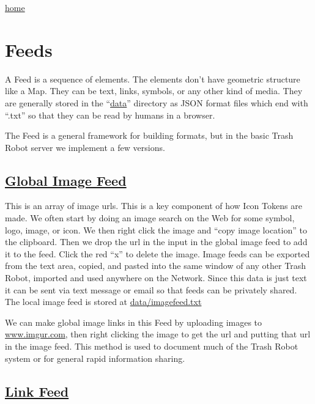 \href{index.html}{home}

\hypertarget{feeds}{%
\section{Feeds}\label{feeds}}

A Feed is a sequence of elements. The elements don't have geometric
structure like a Map. They can be text, links, symbols, or any other
kind of media. They are generally stored in the ``\href{data/}{data}''
directory as JSON format files which end with ``.txt'' so that they can
be read by humans in a browser.

The Feed is a general framework for building formats, but in the basic
Trash Robot server we implement a few versions.

\hypertarget{global-image-feed}{%
\subsection{\texorpdfstring{\href{globalimagefeed.html}{Global Image
Feed}}{Global Image Feed}}\label{global-image-feed}}

This is an array of image urls. This is a key component of how Icon
Tokens are made. We often start by doing an image search on the Web for
some symbol, logo, image, or icon. We then right click the image and
``copy image location'' to the clipboard. Then we drop the url in the
input in the global image feed to add it to the feed. Click the red
``x'' to delete the image. Image feeds can be exported from the text
area, copied, and pasted into the same window of any other Trash Robot,
imported and used anywhere on the Network. Since this data is just text
it can be sent via text message or email so that feeds can be privately
shared. The local image feed is stored at \url{data/imagefeed.txt}

We can make global image links in this Feed by uploading images to
\href{https://imgur.com/}{www.imgur.com}, then right clicking the image
to get the url and putting that url in the image feed. This method is
used to document much of the Trash Robot system or for general rapid
information sharing.

\hypertarget{link-feed}{%
\subsection{\texorpdfstring{\href{linkfeed.html}{Link
Feed}}{Link Feed}}\label{link-feed}}

